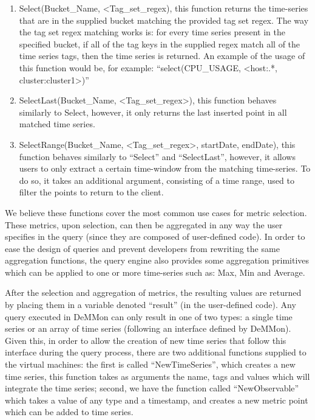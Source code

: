 \begin{enumerate}

    \item Select(Bucket\_Name, <Tag\_set\_regex), this function returns the time-series that are in the supplied bucket matching the provided tag set regex. The way the tag set regex matching works is: for every time series present in the specified bucket, if all of the tag keys in the supplied regex match all of the time series tags, then the time series is returned. An example of the usage of this function would be, for example: ``select(CPU\_USAGE, <host:.*, cluster:cluster1>)''

    \item SelectLast(Bucket\_Name, <Tag\_set\_regex>), this function behaves similarly to Select, however, it only returns the last inserted point in all matched time series.
    
    \item SelectRange(Bucket\_Name, <Tag\_set\_regex>, startDate, endDate), this function behaves similarly to ``Select'' and ``SelectLast'', however, it allows users to only extract a certain time-window from the matching time-series. To do so, it takes an additional argument, consisting of a time range, used to filter the points to return to the client.
    
\end{enumerate}


We believe these functions cover the most common use cases for metric selection. These metrics, upon selection, can then be aggregated in any way the user specifies in the query (since they are composed of user-defined code). In order to ease the design of queries and prevent developers from rewriting the same aggregation functions, the query engine also provides some aggregation primitives which can be applied to one or more time-series such as: Max, Min and Average.

After the selection and aggregation of metrics, the resulting values are returned by placing them in a variable denoted ``result'' (in the user-defined code). Any query executed in DeMMon can only result in one of two types: a single time series or an array of time series (following an interface defined by DeMMon). Given this, in order to allow the creation of new time series that follow this interface during the query process, there are two additional functions supplied to the virtual machines: the first is called ``NewTimeSeries'', which creates a new time series, this function takes as arguments the name, tags and values which will integrate the time series; second, we have the function called ``NewObservable'' which takes a value of any type and a timestamp, and creates a new metric point which can be added to time series.

